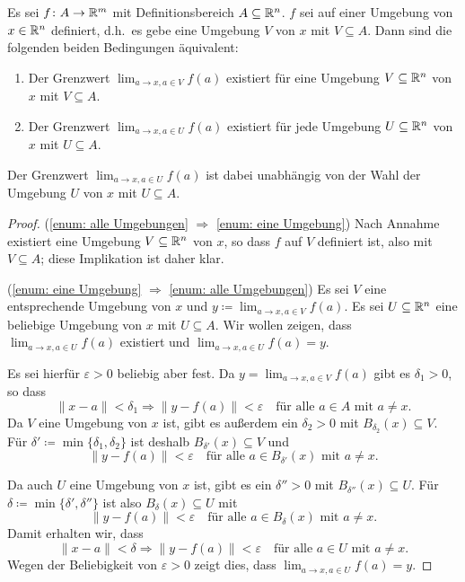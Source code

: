 \documentclass[a4paper,10pt]{article}
\begin{document}
\begin{lem}\label{lem: Unabhängigkeit von Umgebung}
 Es sei $f \colon A \to \mathbb{R}^m$ mit Definitionsbereich $A \subseteq \mathbb{R}^n$. $f$ sei auf einer Umgebung von $x \in \mathbb{R}^n$ definiert, d.h.\ es gebe eine Umgebung $V$ von $x$ mit $V \subseteq A$. Dann sind die folgenden beiden Bedingungen äquivalent:
 \begin{enumerate}
  \item\label{enum: eine Umgebung}
   Der Grenzwert $\lim_{a \to x, a \in V} f(a)$ existiert für eine Umgebung $V \subseteq \mathbb{R}^n$ von $x$ mit $V \subseteq A$.
  \item\label{enum: alle Umgebungen}
   Der Grenzwert $\lim_{a \to x, a \in U} f(a)$ existiert für jede Umgebung $U \subseteq \mathbb{R}^n$ von $x$ mit $U \subseteq A$.
 \end{enumerate}
 Der Grenzwert $\lim_{a \to x, a \in U} f(a)$ ist dabei unabhängig von der Wahl der Umgebung $U$ von $x$ mit $U \subseteq A$.
\end{lem}
\begin{proof} 
 (\ref{enum: alle Umgebungen} $\Rightarrow$ \ref{enum: eine Umgebung}) Nach Annahme existiert eine Umgebung $V \subseteq \mathbb{R}^n$ von $x$, so dass $f$ auf $V$ definiert ist, also mit $V \subseteq A$; diese Implikation ist daher klar.
 
 (\ref{enum: eine Umgebung} $\Rightarrow$ \ref{enum: alle Umgebungen}) Es sei $V$ eine entsprechende Umgebung von $x$ und $y \coloneqq \lim_{a \to x, a \in V} f(a)$. Es sei $U \subseteq \mathbb{R}^n$ eine beliebige Umgebung von $x$ mit $U \subseteq A$. Wir wollen zeigen, dass $\lim_{a \to x, a \in U} f(a)$ existiert und $\lim_{a \to x, a \in U} f(a) = y$.
 
 Es sei hierfür $\varepsilon > 0$ beliebig aber fest. Da $y = \lim_{a \to x, a \in V} f(a)$ gibt es $\delta_1 > 0$, so dass
 \[
  \|x-a\| < \delta_1 \Rightarrow \|y-f(a)\| < \varepsilon
  \quad \text{für alle $a \in A$ mit $a \neq x$}.
 \]
 Da $V$ eine Umgebung von $x$ ist, gibt es außerdem ein $\delta_2 > 0$ mit $B_{\delta_2}(x) \subseteq V$. Für $\delta' \coloneqq \min\{\delta_1, \delta_2\}$ ist deshalb $B_{\delta'}(x) \subseteq V$ und
 \[
  \|y-f(a)\| < \varepsilon
  \quad \text{für alle $a \in B_{\delta'}(x)$ mit $a \neq x$}.
 \]
 
 Da auch $U$ eine Umgebung von $x$ ist, gibt es ein $\delta'' > 0$ mit $B_{\delta''}(x) \subseteq U$. Für $\delta \coloneqq \min\{\delta', \delta''\}$ ist also $B_\delta(x) \subseteq U$ mit
 \[
  \|y-f(a)\| < \varepsilon
  \quad \text{für alle $a \in B_\delta(x)$ mit $a \neq x$}.
 \]
 Damit erhalten wir, dass
 \[
  \|x-a\| < \delta \Rightarrow \|y-f(a)\| < \varepsilon \quad \text{für alle $a \in U$ mit $a \neq x$}.
 \]
 Wegen der Beliebigkeit von $\varepsilon > 0$ zeigt dies, dass $\lim_{a \to x, a \in U} f(a) = y$.
\end{proof}
\end{document}
